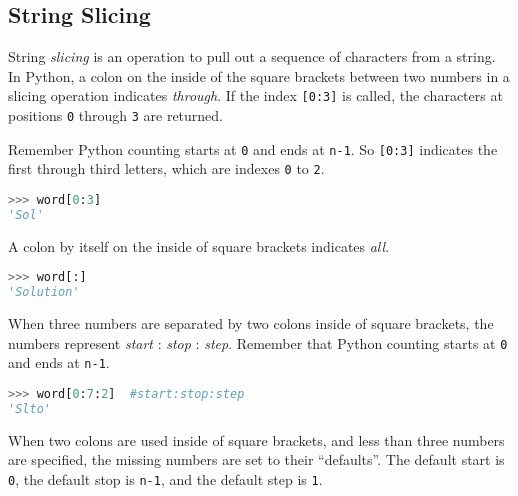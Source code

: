 \documentclass{book}
\newcommand{\passthrough}[1]{#1}
\begin{document}
    
        \hypertarget{string-slicing}{%
\subsection{String Slicing}\label{string-slicing}}

String \emph{slicing} is an operation to pull out a sequence of
characters from a string. In Python, a colon on the inside of the square
brackets between two numbers in a slicing operation indicates
\emph{through}. If the index \passthrough{\lstinline![0:3]!} is called,
the characters at positions \passthrough{\lstinline!0!} through
\passthrough{\lstinline!3!} are returned.

Remember Python counting starts at \passthrough{\lstinline!0!} and ends
at \passthrough{\lstinline!n-1!}. So \passthrough{\lstinline![0:3]!}
indicates the first through third letters, which are indexes
\passthrough{\lstinline!0!} to \passthrough{\lstinline!2!}.

\begin{lstlisting}[language=Python]
>>> word[0:3]
'Sol'
\end{lstlisting}
    




    
        A colon by itself on the inside of square brackets indicates \emph{all}.

\begin{lstlisting}[language=Python]
>>> word[:]
'Solution'
\end{lstlisting}
    




    
        When three numbers are separated by two colons inside of square
brackets, the numbers represent \emph{start} : \emph{stop} :
\emph{step}. Remember that Python counting starts at
\passthrough{\lstinline!0!} and ends at \passthrough{\lstinline!n-1!}.

\begin{lstlisting}[language=Python]
>>> word[0:7:2]  #start:stop:step
'Slto'
\end{lstlisting}
    




    
        When two colons are used inside of square brackets, and less than three
numbers are specified, the missing numbers are set to their
``defaults''. The default start is \passthrough{\lstinline!0!}, the
default stop is \passthrough{\lstinline!n-1!}, and the default step is
\passthrough{\lstinline!1!}.
\end{document}
